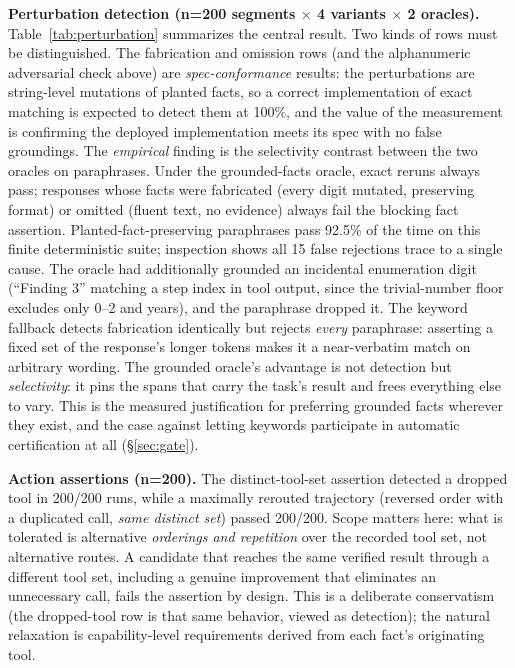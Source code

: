 \documentclass{article}
\begin{document}
\textbf{Perturbation detection (n=200 segments $\times$ 4 variants $\times$ 2 oracles).} Table~\ref{tab:perturbation} summarizes the central result. Two kinds of rows must be distinguished. The fabrication and omission rows (and the alphanumeric adversarial check above) are \emph{spec-conformance} results: the perturbations are string-level mutations of planted facts, so a correct implementation of exact matching is expected to detect them at 100\%, and the value of the measurement is confirming the deployed implementation meets its spec with no false groundings. The \emph{empirical} finding is the selectivity contrast between the two oracles on paraphrases. Under the grounded-facts oracle, exact reruns always pass; responses whose facts were fabricated (every digit mutated, preserving format) or omitted (fluent text, no evidence) always fail the blocking fact assertion. Planted-fact-preserving paraphrases pass 92.5\% of the time on this finite deterministic suite; inspection shows all 15 false rejections trace to a single cause. The oracle had additionally grounded an incidental enumeration digit (``Finding 3'' matching a step index in tool output, since the trivial-number floor excludes only 0--2 and years), and the paraphrase dropped it. The keyword fallback detects fabrication identically but rejects \emph{every} paraphrase: asserting a fixed set of the response's longer tokens makes it a near-verbatim match on arbitrary wording. The grounded oracle's advantage is not detection but \emph{selectivity}: it pins the spans that carry the task's result and frees everything else to vary. This is the measured justification for preferring grounded facts wherever they exist, and the case against letting keywords participate in automatic certification at all (\S\ref{sec:gate}).

\textbf{Action assertions (n=200).} The distinct-tool-set assertion detected a dropped tool in 200/200 runs, while a maximally rerouted trajectory (reversed order with a duplicated call, \emph{same distinct set}) passed 200/200. Scope matters here: what is tolerated is alternative \emph{orderings and repetition} over the recorded tool set, not alternative routes. A candidate that reaches the same verified result through a different tool set, including a genuine improvement that eliminates an unnecessary call, fails the assertion by design. This is a deliberate conservatism (the dropped-tool row is that same behavior, viewed as detection); the natural relaxation is capability-level requirements derived from each fact's originating tool.
\end{document}
